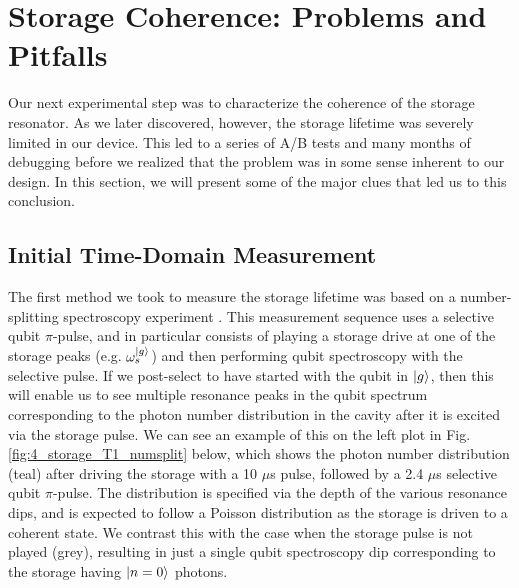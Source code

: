 \section{Storage Coherence: Problems and Pitfalls \label{sec:4_StorageCoherenceProblems}}

Our next experimental step was to characterize the coherence of the storage resonator. As we later discovered, however, the storage lifetime was severely limited in our device. This led to a series of A/B tests and many months of debugging before we realized that the problem was in some sense inherent to our design. In this section, we will present some of the major clues that led us to this conclusion. 

\subsection{Initial Time-Domain Measurement}

The first method we took to measure the storage lifetime was based on a number-splitting spectroscopy experiment \cite{schuster2007resolving}. This measurement sequence uses a selective qubit $\pi$-pulse, and in particular consists of playing a storage drive at one of the storage peaks (e.g. $\omega_s^{\lvert g\rangle}$) and then performing qubit spectroscopy with the selective pulse. If we post-select to have started with the qubit in $\lvert g\rangle$, then this will enable us to see multiple resonance peaks in the qubit spectrum corresponding to the photon number distribution in the cavity after it is excited via the storage pulse. We can see an example of this on the left plot in Fig. \ref{fig:4_storage_T1_numsplit} below, which shows the photon number distribution (teal) after driving the storage with a 10 $\mu$s pulse, followed by a 2.4 $\mu$s selective qubit $\pi$-pulse. The distribution is specified via the depth of the various resonance dips, and is expected to follow a Poisson distribution as the storage is driven to a coherent state. We contrast this with the case when the storage pulse is not played (grey), resulting in just a single qubit spectroscopy dip corresponding to the storage having $\lvert n=0\rangle$ photons. 

